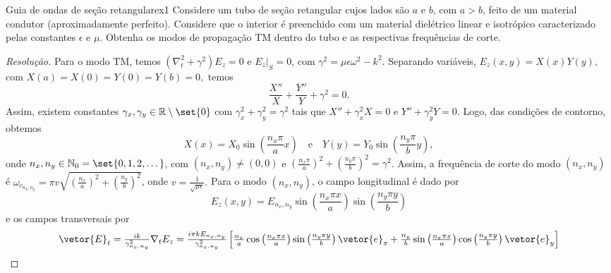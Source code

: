 \begin{exercício}{Guia de ondas de seção retangular}{ex1}
    Considere um tubo de seção retangular cujos lados são \(a\) e \(b\), com \(a > b\), feito de um material condutor (aproximadamente perfeito). Considere que o interior é preenchido com um material dielétrico linear e isotrópico caracterizado pelas constantes \(\epsilon\) e \(\mu\). Obtenha os modos de propagação TM dentro do tubo e as respectivas frequências de corte.
\end{exercício}
\begin{proof}[Resolução]
    Para o modo TM, temos \((\nabla_t^2 + \gamma^2)E_z = 0\) e \(\left.E_z\right|_S = 0\), com \(\gamma^2 = \mu \epsilon \omega^2 - k^2\). Separando variáveis, \(E_z(x,y) = X(x) Y(y),\) com \(X(a) = X(0) = Y(0) = Y(b) = 0,\) temos
    \begin{equation*}
        \frac{X''}{X} + \frac{Y''}{Y} + \gamma^2 = 0.
    \end{equation*}
    Assim, existem constantes \(\gamma_x, \gamma_y \in \mathbb{R} \setminus \set{0}\) com \(\gamma_x^2 + \gamma_y^2 = \gamma^2\) tais que \(X'' + \gamma_x^2 X = 0\) e \(Y'' + \gamma_y^2 Y = 0\). Logo, das condições de contorno, obtemos
    \begin{equation*}
        X(x) = X_0 \sin\left(\frac{n_x\pi}{a}x\right)
        \quad\text{e}\quad
        Y(y) = Y_0 \sin\left(\frac{n_y\pi}{b}y\right),
    \end{equation*}
    onde \(n_x, n_y \in \mathbb{N}_0 = \set{0,1,2, \dots}\), com \((n_x,n_y) \neq (0,0)\) e \(\left(\frac{n_x\pi}{a}\right)^2 + \left(\frac{n_y \pi}{b}\right)^2 = \gamma^2\). Assim, a frequência de corte do modo \((n_x, n_y)\) é \(\omega_{c_{n_x, n_y}} = \pi v \sqrt{\left(\frac{n_x}{a}\right)^2 + \left(\frac{n_y}{b}\right)^2}\), onde \(v = \frac{1}{\sqrt{\mu \epsilon}}.\) Para o modo \((n_x, n_y)\), o campo longitudinal é dado por
    \begin{equation*}
        E_z(x,y) = E_{n_x, n_y} \sin\left(\frac{n_x \pi x}{a}\right)\sin\left(\frac{n_y \pi y}{b}\right)
    \end{equation*}
    e os campos transversais por
    \begin{equation*}
        \textstyle
        \vetor{E}_t = \frac{ik}{\gamma_{n_x, n_y}^2} \nabla_t E_z = \frac{i \pi k E_{n_x, n_y}}{\gamma^2_{n_x, n_y}}\left[\frac{n_x}{a}\cos\left(\frac{n_x \pi x}{a}\right)\sin\left(\frac{n_y \pi y}{b}\right)\vetor{e}_x + \frac{n_y}{b}\sin\left(\frac{n_x \pi x}{a}\right)\cos\left(\frac{n_y \pi y}{b}\right)\vetor{e}_y\right]

\end{equation*}
\end{proof}
